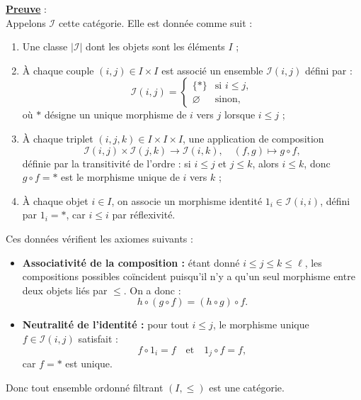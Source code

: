 \documentclass[a4paper, 14pt]{report}
\begin{document}
\begin{onehalfspace}
{			\textbf{\underline{Preuve}} : \\
			Appelons \( \mathcal{I} \)  cette catégorie. Elle est donnée comme suit :
			\begin{enumerate}[label=\roman*)]
				\item Une classe \( |\mathcal{I}| \) dont les objets sont les éléments  \( I \) ;
				\item À chaque couple \( (i, j) \in I \times I \) est associé un ensemble \( \mathcal{I}(i, j) \) défini par :
				\[
				\mathcal{I}(i, j) =
				\begin{cases}
					\{\ast\} & \text{si } i \leq j, \\
					\varnothing & \text{sinon},
				\end{cases}
				\]
				où \( \ast \) désigne un unique morphisme de \( i \) vers \( j \) lorsque \( i \leq j \) ;
				\item À chaque triplet \( (i, j, k) \in I\times I\times I \), une application de composition
				\[
				\mathcal{I}(i, j) \times \mathcal{I}(j, k) \to \mathcal{I}(i, k), \quad (f, g) \mapsto g \circ f,
				\]
				définie par la transitivité de l’ordre : si \( i \leq j \) et \( j \leq k \), alors \( i \leq k \), donc \( g \circ f = \ast \) est le morphisme unique de \( i \) vers \( k \) ;
				\item À chaque objet \( i \in I \), on associe un morphisme identité \( 1_i \in \mathcal{I}(i, i) \), défini par \( 1_i = \ast \), car \( i \leq i \) par réflexivité.
			\end{enumerate}
			
			Ces données vérifient les axiomes suivants :
			\begin{itemize}
				\item \textbf{Associativité de la composition :} étant donné \( i \leq j \leq k \leq \ell \), les compositions possibles coïncident puisqu'il n’y a qu’un seul morphisme entre deux objets liés par \( \leq \). On a donc :
				\[
				h \circ (g \circ f) = (h \circ g) \circ f.
				\]
				\item \textbf{Neutralité de l'identité :} pour tout \( i \leq j \), le morphisme unique \( f \in \mathcal{I}(i, j) \) satisfait :
				\[
				f \circ 1_i = f \quad \text{et} \quad 1_j \circ f = f,
				\]
				car \( f = \ast \) est unique.
			\end{itemize}
Donc tout ensemble ordonné filtrant \( (I, \leq) \) est une catégorie.
			
			
			
}
\end{onehalfspace}
\end{document}
